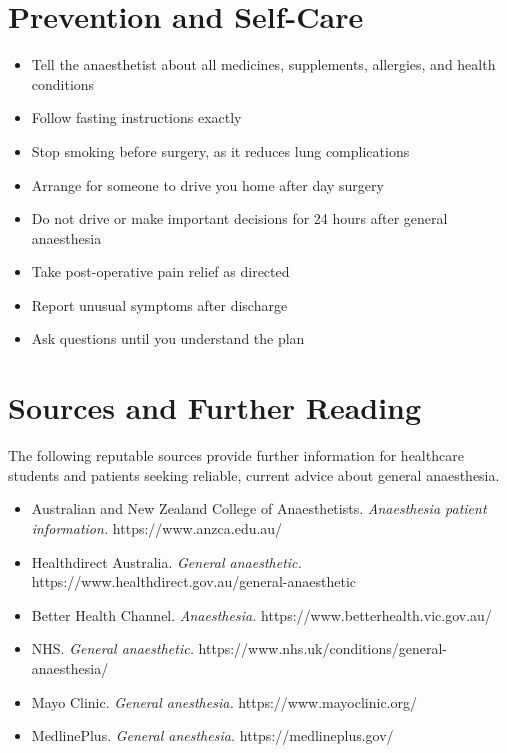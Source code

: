 \section*{Prevention and Self-Care}
\begin{itemize}
    \item Tell the anaesthetist about all medicines, supplements, allergies, and health conditions
    \item Follow fasting instructions exactly
    \item Stop smoking before surgery, as it reduces lung complications
    \item Arrange for someone to drive you home after day surgery
    \item Do not drive or make important decisions for 24 hours after general anaesthesia
    \item Take post-operative pain relief as directed
    \item Report unusual symptoms after discharge
    \item Ask questions until you understand the plan
\end{itemize}

\section*{Sources and Further Reading}
The following reputable sources provide further information for healthcare students and patients seeking reliable, current advice about general anaesthesia.
\begin{itemize}
    \item Australian and New Zealand College of Anaesthetists. \textit{Anaesthesia patient information.} https://www.anzca.edu.au/
    \item Healthdirect Australia. \textit{General anaesthetic.} https://www.healthdirect.gov.au/general-anaesthetic
    \item Better Health Channel. \textit{Anaesthesia.} https://www.betterhealth.vic.gov.au/
    \item NHS. \textit{General anaesthetic.} https://www.nhs.uk/conditions/general-anaesthesia/
    \item Mayo Clinic. \textit{General anesthesia.} https://www.mayoclinic.org/
    \item MedlinePlus. \textit{General anesthesia.} https://medlineplus.gov/
\end{itemize}
